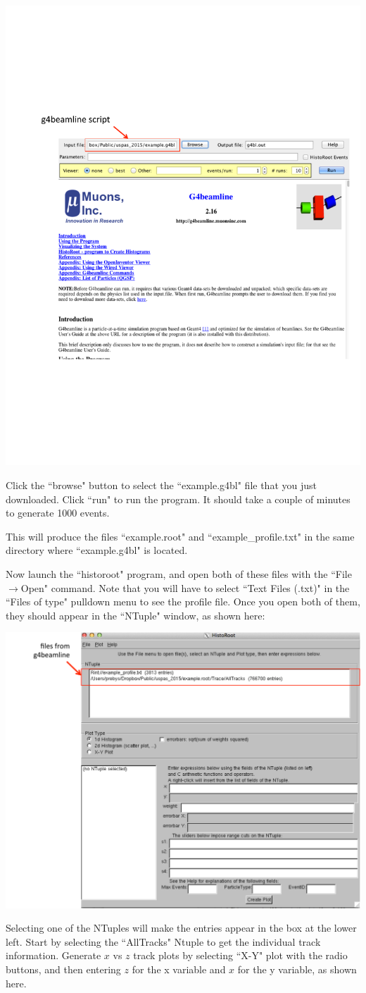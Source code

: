\documentclass{article}
\begin{document}
\centerline{\includegraphics*[width=80 mm]{g4bl.pdf}}

Click the ``browse" button to select the ``example.g4bl" file that you just downloaded.  Click ``run" to run the program.  It should take a couple of minutes to generate 1000 events.

This will produce the files ``example.root" and ``example\_profile.txt" in the same directory where ``example.g4bl" is located.  

Now launch the ``historoot" program, and open both of these files with the 	``File$\rightarrow$Open" command.  Note that you will have to select ``Text Files (.txt)" in the ``Files of type" pulldown menu to see the profile file.   Once you open both of them, they should appear in the ``NTuple" window, as shown here:

\centerline{\includegraphics*[width=80 mm]{historoot1.pdf}}

Selecting one of the NTuples will make the entries appear in the box at the lower left.  Start by selecting the ``AllTracks" Ntuple to get the individual track information.  Generate $x$ vs $z$ track plots by selecting ``X-Y" plot with the radio buttons, and then entering $z$ for the x variable and $x$ for the y variable, as shown here.
\end{document}
